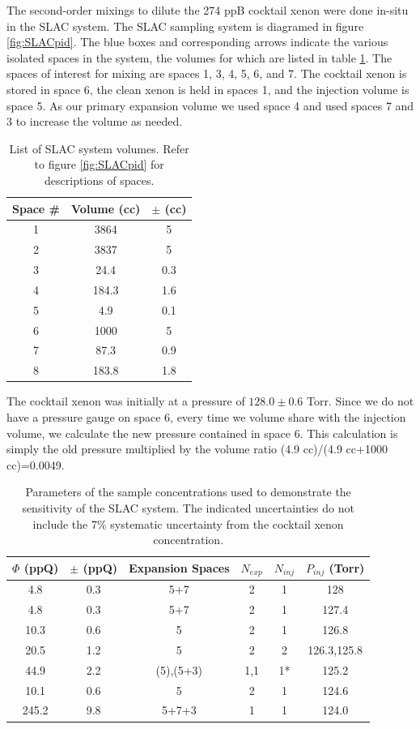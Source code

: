 \documentclass[12pt]{article}
\begin{document}
The second-order mixings to dilute the 274 ppB cocktail xenon were done in-situ in the SLAC system. The SLAC sampling system is diagramed in figure \ref{fig:SLACpid}. The blue boxes and corresponding arrows indicate the various isolated spaces in the system, the volumes for which are listed in table \ref{tab:SLACvols}. The spaces of interest for mixing are spaces 1, 3, 4, 5, 6, and 7. The cocktail xenon is stored in space 6, the clean xenon is held in spaces 1, and the injection volume is space 5. As our primary expansion volume we used space 4 and used spaces 7 and 3 to increase the volume as needed.
\begin{table}[h!]
\centering
 \label{tab:SLACvols}
 \begin{tabular}{ c | c | c }
 \hline
 \hline
 Space \# & Volume (cc) & $\pm$ (cc) \\ 
 \hline\hline
1 & 3864 & 5 \\ 
2 & 3837 & 5 \\
3 & 24.4 & 0.3 \\
4 & 184.3 &1.6 \\
5 & 4.9 & 0.1 \\
6 & 1000 & 5 \\
7 & 87.3 & 0.9 \\
8 & 183.8 & 1.8 \\
 \hline
 \hline
\end{tabular}
\caption{List of SLAC system volumes. Refer to figure \ref{fig:SLACpid} for descriptions of spaces.}
\end{table}

The cocktail xenon was initially at a pressure of $128.0\pm0.6$ Torr. Since we do not have a pressure gauge on space 6, every time we volume share with the injection volume, we calculate the new pressure contained in space 6. This calculation is simply the old pressure multiplied by the volume ratio (4.9 cc)/(4.9 cc+1000 cc)=0.0049.
 \begin{table}[h!]
 \centering
 \label{tab:concentrations}
 \begin{tabular}{ c | c | c | c | c | c}
 \hline
 \hline
 $\Phi$ (ppQ) & $\pm$ (ppQ) &  Expansion Spaces & $N_{exp}$ & $N_{inj}$ & $P_{inj}$ (Torr) \\ 
 \hline
 \hline
4.8 & 0.3 & 5+7 & 2 & 1 & 128 \\ 
4.8 & 0.3 & 5+7 & 2 & 1 & 127.4 \\ 
10.3 & 0.6 & 5 & 2 & 1 &126.8 \\
20.5 & 1.2 & 5 & 2 & 2 & 126.3,125.8 \\
44.9 & 2.2 & (5),(5+3) & 1,1 & 1* & 125.2 \\
10.1 & 0.6 & 5 & 2 & 1 & 124.6 \\
245.2 & 9.8 & 5+7+3 & 1 & 1 & 124.0 \\
 \hline
 \hline
\end{tabular}
\caption{Parameters of the sample concentrations used to demonstrate the sensitivity of the SLAC system. The indicated uncertainties do not include the 7\% systematic uncertainty from the cocktail xenon concentration.}
\end{table}
\end{document}

